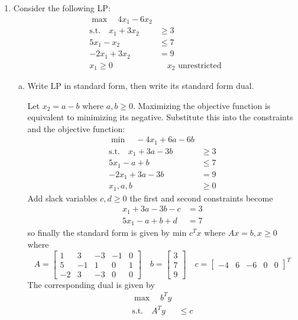 \documentclass{article}
\begin{document}
\begin{enumerate}
	\item Consider the following LP:
		\begin{align*}
			\max \quad 4x_1-6x_2 & \\
			\text{s.t.}\quad x_1+3x_2 &\ge 3 \\
			5x_1-x_2 &\le 7 \\
			-2x_1+3x_2 &= 9 \\
			x_1\ge 0 &\quad x_2\text{ unrestricted}
		\end{align*}

		\begin{enumerate}[a)]
			\item Write LP in standard form, then write its standard form dual.
				\begin{soln}
					Let $x_2=a-b$ where $a, b\ge 0.$ Maximizing the objective function is equivalent to minimizing its negative. Substitute this into the constraints and the objective function:
					\begin{align*}
						\min\quad -4x_1+6a-6b & \\
						\text{s.t.}\quad x_1+3a-3b &\ge 3 \\
						5x_1-a+b &\le 7 \\
						-2x_1+3a-3b &= 9 \\
						x_1, a, b&\ge 0
					\end{align*}
					Add slack variables $c, d\ge 0$ the first and second constraints become
					\begin{align*}
						x_1+3a-3b-c &= 3 \\
						5x_1-a+b+d &= 7
					\end{align*} so finally the standard form is given by min $c^T x$ where $Ax=b, x\ge 0$ where \[A=\begin{bmatrix}
							1 & 3 & -3 & -1 & 0 \\
							5 & -1 & 1 & 0 & 1 \\
							-2 & 3 & -3 & 0 & 0
						\end{bmatrix}\quad b=\begin{bmatrix}
							3 \\ 7 \\ 9
						\end{bmatrix}\quad c=\begin{bmatrix}
							-4 & 6 & -6 & 0 & 0
					\end{bmatrix}^T\] The corresponding dual is given by
					\begin{align*}
						\max\quad b^T y & \\
						\text{s.t.}\quad A^T y &\le c \\

\end{align*}
\end{soln}
\end{enumerate}
\end{enumerate}
\end{document}
